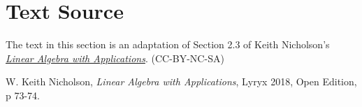 \documentclass{ximera}
\begin{document}
\section*{Text Source}
The text in this section is an adaptation of Section 2.3 of Keith Nicholson's \href{https://open.umn.edu/opentextbooks/textbooks/linear-algebra-with-applications}{\it Linear Algebra with Applications}. (CC-BY-NC-SA)

W. Keith Nicholson, {\it Linear Algebra with Applications}, Lyryx 2018, Open Edition, p 73-74.
\end{document}
